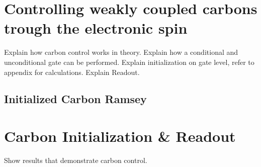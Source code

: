 \section{Controlling weakly coupled carbons trough the electronic spin}

Explain how carbon control works in theory.
Explain how a conditional and unconditional gate can be performed.
Explain initialization on gate level, refer to appendix for calculations.
Explain Readout.

\subsection{Initialized Carbon Ramsey}


\section{Carbon Initialization \& Readout}
Show results that demonstrate carbon control.



